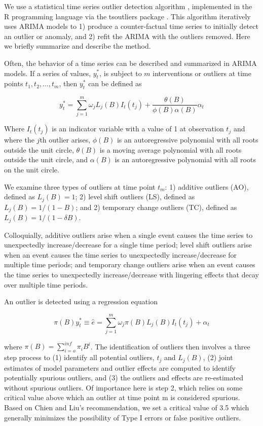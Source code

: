 \documentclass[12pt]{article}
\begin{document}
We use a statistical time series outlier detection algorithm
\citep{chen1993joint}, implemented in the R programming language
\citep{rcore} via the tsoutliers package \citep{tsoutliers2019}. This
algorithm iteratively uses ARIMA models to 1) produce a counter-factual
time series to initially detect an outlier or anomaly, and 2) refit the
ARIMA with the outliers removed. Here we briefly summarize and describe
the method.

Often, the behavior of a time series can be described and summarized in
ARIMA models. If a series of values, \(y_t^*\), is subject to \(m\)
interventions or outliers at time points \(t_1,t_2,…,t_m\), then
\(y_t^*\) can be defined as

\[y_t^* = \sum_{j=1}^{m} \omega_jL_j(B)I_t(t_j) + \frac{\theta(B)}{\phi(B)\alpha(B)}\alpha_t\]

Where \(I_t(t_j)\) is an indicator variable with a value of 1 at
observation \(t_j\) and where the \(j\)th outlier arises, \(\phi(B)\) is
an autoregressive polynomial with all roots outside the unit circle,
\(\theta(B)\) is a moving average polynomial with all roots outside the
unit circle, and \(\alpha(B)\) is an autoregressive polynomial with all
roots on the unit circle.

We examine three types of outliers at time point \(t_m\): 1) additive
outliers (AO), defined as \(L_j(B)=1\); 2) level shift outliers (LS),
defined as \(L_j(B) = 1/(1-B)\); and 2) temporary change outliers (TC),
defined as \(L_j(B) = 1/(1-\delta B)\).

Colloquially, additive outliers arise when a single event causes the
time series to unexpectedly increase/decrease for a single time period;
level shift outliers arise when an event causes the time series to
unexpectedly increase/decrease for multiple time periods; and temporary
change outliers arise when an event causes the time series to
unexpectedly increase/decrease with lingering effects that decay over
multiple time periods.

An outlier is detected using a regression equation

\[ \pi(B)y_t^* \equiv \hat{e} = \sum_{j=1}^m \omega_j \pi(B)L_j(B)I_t(t_j) + \alpha_t \]

where \(\pi(B)=\sum_{i=o}^{inf} \pi_iB^i\). The identification of
outliers then involves a three step process to (1) identify all
potential outliers, \(t_j\) and \(L_j (B)\), (2) joint estimates of
model parameters and outlier effects are computed to identify
potentially spurious outliers, and (3) the outliers and effects are
re-estimated without spurious outliers. Of importance here is step 2,
which relies on some critical value above which an outlier at time point
m is considered spurious. Based on Chien and Liu's
\citeyearpar{chen1993joint} recommendation, we set a critical value of
3.5 which generally minimizes the possibility of Type I errors or false
positive outliers.
\end{document}
